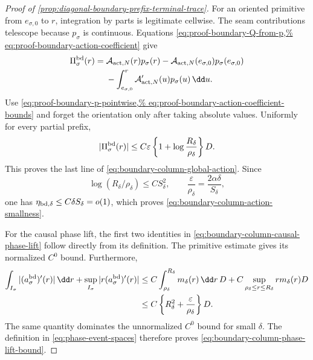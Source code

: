 \begin{proof}[Proof of
\cref{prop:diagonal-boundary-prefix-terminal-trace}]
For an oriented primitive from \(e_{\sigma,0}\) to \(r\), integration by
parts is legitimate cellwise.  The seam contributions telescope because
\(p_\sigma\) is continuous.  Equations
\cref{eq:proof-boundary-Q-from-p,%
eq:proof-boundary-action-coefficient} give
\begin{align}
 \Pi_\sigma^{\rm bd}(r)
 ={}&\mathcal A_{{\rm act},N}(r)p_\sigma(r)
   -\mathcal A_{{\rm act},N}(e_{\sigma,0})
       p_\sigma(e_{\sigma,0})\notag\\
 &{}-\int_{e_{\sigma,0}}^r
       \mathcal A_{{\rm act},N}'(u)p_\sigma(u)\,\dd u .      \label{eq:proof-boundary-action-integration-by-parts}
\end{align}
Use
\cref{eq:proof-boundary-p-pointwise,%
eq:proof-boundary-action-coefficient-bounds} and forget the orientation
only after taking absolute values.  Uniformly for every partial prefix,
\begin{equation}
 |\Pi_\sigma^{\rm bd}(r)|
 \le C\varepsilon
       \left\{1+\log\frac{R_\delta}{\rho_\delta}\right\}D.
                                                        \label{eq:proof-boundary-prefix-bound}
\end{equation}
This proves the last line of
\cref{eq:boundary-column-global-action}.  Since
\begin{equation*}
 \log(R_\delta/\rho_\delta)\le CS_\delta^2,\qquad
 \frac{\varepsilon}{\rho_\delta}=\frac{2\alpha\delta}{S_\delta},
\end{equation*}
one has \(\eta_{{\rm bd},\delta}\le C\delta S_\delta=o(1)\),
which proves \cref{eq:boundary-column-action-smallness}.

For the causal phase lift, the first two identities in
\cref{eq:boundary-column-causal-phase-lift} follow directly from its
definition.  The primitive estimate gives its normalized \(C^0\) bound.
Furthermore,
\begin{align*}
 \int_{I_\sigma}|(a_\sigma^{\rm bd})'(r)|\,\dd r
 +\sup_{I_\sigma}|r(a_\sigma^{\rm bd})'(r)|
 &\le C\int_{\rho_\delta}^{R_\delta}m_\delta(r)\,\dd r\,D
    +C\sup_{\rho_\delta\le r\le R_\delta}r m_\delta(r)D\\
 &\le C\left\{R_\delta^2
          +\frac{\varepsilon}{\rho_\delta}\right\}D.
\end{align*}
The same quantity dominates the unnormalized \(C^0\) bound for small
\(\delta\).  The definition in \cref{eq:phase-event-spaces} therefore
proves \cref{eq:boundary-column-phase-lift-bound}.


\end{proof}
